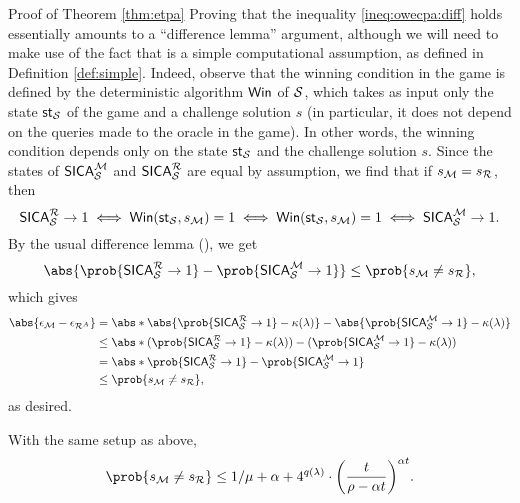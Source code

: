 \begin{namedproof}{Proof of Theorem \ref{thm:etpa}}
  Proving that the inequality \eqref{ineq:owecpa:diff} holds
  essentially amounts to a ``difference lemma'' argument,
  although we will need to make use of the fact that \Simple is a simple computational assumption,
  as defined in Definition \ref{def:simple}.
  Indeed, observe that the winning condition in the game \SICA
  is defined by the deterministic algorithm \(\mathsf{Win}\) of \(\mathcal{S}\),
  which takes as input only the state \(\mathsf{st}_{\mathcal{S}}\) of the game and a challenge solution \(s\)
  (in particular, it does not depend on the queries made to the oracle \oracle
  in the game).
  In other words, the winning condition depends only on the state
  \(\mathsf{st}_{\mathcal{S}}\) and the challenge solution \(s\).
  Since the states of \(\mathsf{SICA}_{\mathcal{S}}^{\mathcal{M}}\) and \(\SICA_{\Simple}^{\redR}\)
  are equal by assumption, we find that if \(s_{\redM} = s_{\redR}\), then
  \[
  \SICA_{\Simple}^{\redR} \to 1 \iff \Win(\state_{\Simple},s_{\redM}) = 1 \iff \Win(\state_{\Simple},s_{\redM}) = 1 \iff \SICA_{\Simple}^{\redM} \to 1.
  \]
  By the usual difference lemma (), we get
  \[
    \abs{\prob{\SICA_{\Simple}^{\redR} \to 1} - \prob{\SICA_{\Simple}^{\redM} \to 1}}
    \le \prob{s_{\redM} \ne s_{\redR}},
  \]
  which gives
  \begin{align}
    \abs{\epsilon_{\redM} - \epsilon_{\redR^{A}}}
    & = \abs*{\abs{\prob{\SICA_{\Simple}^{\redR} \to 1} - \kappa(\lambda)} - \abs{\prob{\SICA_{\Simple}^{\redM} \to 1} - \kappa(\lambda)}} \notag\\
    & \le \abs*{(\prob{\SICA_{\Simple}^{\redR} \to 1} - \kappa(\lambda)) - (\prob{\SICA_{\Simple}^{\redM} \to 1} - \kappa(\lambda))} \notag\\
    & = \abs*{\prob{\SICA_{\Simple}^{\redR} \to 1} - \prob{\SICA_{\Simple}^{\redM} \to 1}} \notag\\
    & \le \prob{s_{\redM} \ne s_{\redR}} \notag,
  \end{align}
  as desired.
\end{namedproof}

\begin{lemma}\label{lemma:M}
  With the same setup as above,
  \begin{equation}
    \prob{s_{\redM} \ne s_{\redR}}
    \le 1/\mu + \alpha
    + 4^{q(\lambda)} \cdot \left( \frac{t}{\rho - \alpha t} \right)^{\alpha t}.
  \end{equation}
\end{lemma}

